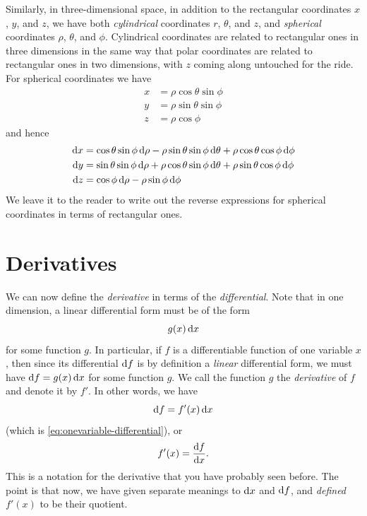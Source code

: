 Similarly, in three-dimensional space, in addition to the rectangular coordinates $x$, $y$, and $z$, we have both \emph{cylindrical} coordinates $r$, $\theta$, and $z$, and \emph{spherical} coordinates $\rho$, $\theta$, and $\phi$.
Cylindrical coordinates are related to rectangular ones in three dimensions in the same way that polar coordinates are related to rectangular ones in two dimensions, with $z$ coming along untouched for the ride.
For spherical coordinates we have
\begin{align*}
  x &= \rho \cos\theta \sin\phi\\
  y &= \rho \sin\theta \sin\phi\\
  z &= \rho\cos\phi
\end{align*}
and hence
\begin{align*}
  {\ensuremath{\mathrm{d} x}} &= \cos\theta \sin\phi \,{\mathrm{d} \rho} - \rho\sin\theta\sin\phi \,{\mathrm{d} \theta} + \rho\cos\theta\cos\phi \,{\mathrm{d} \phi}\\
  {\mathrm{d} y} &= \sin\theta \sin\phi\,{\mathrm{d} \rho} + \rho\cos\theta\sin\phi \,{\mathrm{d} \theta} + \rho\sin\theta\cos\phi \,{\mathrm{d} \phi}\\
  {\mathrm{d} z} &= \cos\phi\,{\mathrm{d} \rho} - \rho\sin\phi\,{\mathrm{d} \phi}
\end{align*}
We leave it to the reader to write out the reverse expressions for spherical coordinates in terms of rectangular ones.


\section{Derivatives}
\label{sec:derivatives}

We can now define the \emph{derivative} in terms of the \emph{differential}.
Note that in one dimension, a linear differential form must be of the form
\[ g(x) \,{\mathrm{d} x} \]
for some function $g$.
In particular, if $f$ is a differentiable function of one variable $x$, then since its differential ${\mathrm{d} f}$ is by definition a \emph{linear} differential form, we must have ${\mathrm{d} f} = g(x) \, {\mathrm{d} x}$ for some function $g$.
We call the function $g$ the \emph{derivative} of $f$ and denote it by $f'$.
In other words, we have
\[{\mathrm{d} f} = f'(x)\,{\mathrm{d} x}\]
(which is \cref{eq:onevariable-differential}), or
\[ f'(x) = \frac{{\mathrm{d} f}}{{\mathrm{d} x}}. \]
This is a notation for the derivative that you have probably seen before.
The point is that now, we have given separate meanings to ${\mathrm{d} x}$ and ${\mathrm{d} f}$, and \emph{defined} $f'(x)$ to be their quotient.

